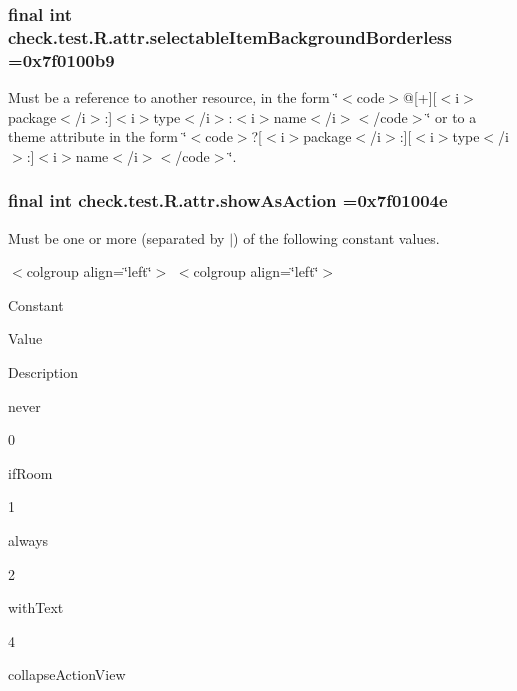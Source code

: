 \subsubsection[{selectable\+Item\+Background\+Borderless}]{\setlength{\rightskip}{0pt plus 5cm}final int check.\+test.\+R.\+attr.\+selectable\+Item\+Background\+Borderless =0x7f0100b9\hspace{0.3cm}{\ttfamily [static]}}\label{classcheck_1_1test_1_1_r_1_1attr_a62db15ed42075eacd557934728d69a02}
Must be a reference to another resource, in the form \char`\"{}$<$code$>$@\mbox{[}+\mbox{]}\mbox{[}$<$i$>$package$<$/i$>$\+:\mbox{]}$<$i$>$type$<$/i$>$\+:$<$i$>$name$<$/i$>$$<$/code$>$\char`\"{} or to a theme attribute in the form \char`\"{}$<$code$>$?\mbox{[}$<$i$>$package$<$/i$>$\+:\mbox{]}\mbox{[}$<$i$>$type$<$/i$>$\+:\mbox{]}$<$i$>$name$<$/i$>$$<$/code$>$\char`\"{}. \hypertarget{classcheck_1_1test_1_1_r_1_1attr_a696ac4659352897d9af0044b2b9ecd16}{}
\subsubsection[{show\+As\+Action}]{\setlength{\rightskip}{0pt plus 5cm}final int check.\+test.\+R.\+attr.\+show\+As\+Action =0x7f01004e\hspace{0.3cm}{\ttfamily [static]}}\label{classcheck_1_1test_1_1_r_1_1attr_a696ac4659352897d9af0044b2b9ecd16}
Must be one or more (separated by \textquotesingle{}$\vert$\textquotesingle{}) of the following constant values.

\begin{TabularC}{0}
\hline
\end{TabularC}
$<$colgroup align=\char`\"{}left\char`\"{}$>$ $<$colgroup align=\char`\"{}left\char`\"{}$>$ 

Constant

Value

Description 

{\ttfamily never}

0

{\ttfamily if\+Room}

1

{\ttfamily always}

2

{\ttfamily with\+Text}

4

{\ttfamily collapse\+Action\+View}


